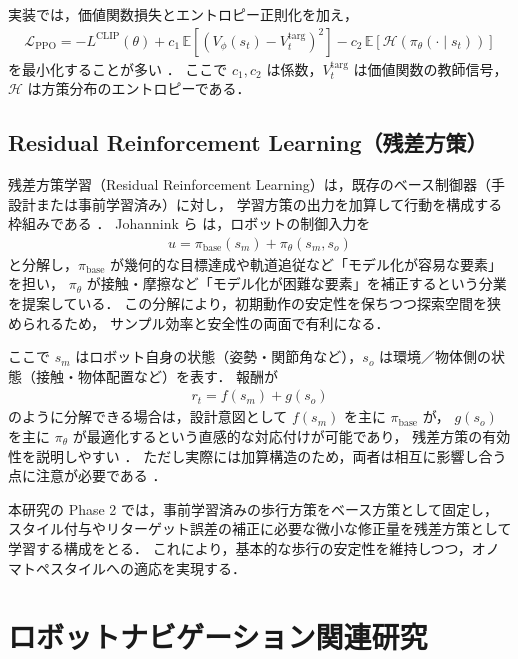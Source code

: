 実装では，価値関数損失とエントロピー正則化を加え，
\begin{align}
  \mathcal{L}_{\mathrm{PPO}}
  = -L^{\mathrm{CLIP}}(\theta)
  + c_1\,\mathbb{E}\left[(V_\phi(s_t)-V_t^{\mathrm{targ}})^2\right]
  - c_2\,\mathbb{E}\left[\mathcal{H}(\pi_\theta(\cdot\mid s_t))\right]
  \label{eq:ppo_full}
\end{align}
を最小化することが多い \cite{PPO}．
ここで $c_1,c_2$ は係数，$V_t^{\mathrm{targ}}$ は価値関数の教師信号，
$\mathcal{H}$ は方策分布のエントロピーである．

\subsection{Residual Reinforcement Learning（残差方策）}
\label{subsec:residual_rl}

残差方策学習（Residual Reinforcement Learning）は，既存のベース制御器（手設計または事前学習済み）に対し，
学習方策の出力を加算して行動を構成する枠組みである \cite{residual_rl}．
Johannink ら \cite{residual_rl} は，ロボットの制御入力を
\begin{align}
  u = \pi_{\mathrm{base}}(s_m) + \pi_{\theta}(s_m, s_o)
\end{align}
と分解し，$\pi_{\mathrm{base}}$ が幾何的な目標達成や軌道追従など「モデル化が容易な要素」を担い，
$\pi_{\theta}$ が接触・摩擦など「モデル化が困難な要素」を補正するという分業を提案している．
この分解により，初期動作の安定性を保ちつつ探索空間を狭められるため，
サンプル効率と安全性の両面で有利になる．

ここで $s_m$ はロボット自身の状態（姿勢・関節角など），$s_o$ は環境／物体側の状態（接触・物体配置など）を表す．
報酬が
\begin{align}
  r_t = f(s_m) + g(s_o)
\end{align}
のように分解できる場合は，設計意図として $f(s_m)$ を主に $\pi_{\mathrm{base}}$ が，
$g(s_o)$ を主に $\pi_{\theta}$ が最適化するという直感的な対応付けが可能であり，
残差方策の有効性を説明しやすい \cite{residual_rl}．
ただし実際には加算構造のため，両者は相互に影響し合う点に注意が必要である \cite{residual_rl}．

本研究の Phase 2 では，事前学習済みの歩行方策をベース方策として固定し，
スタイル付与やリターゲット誤差の補正に必要な微小な修正量を残差方策として学習する構成をとる．
これにより，基本的な歩行の安定性を維持しつつ，オノマトペスタイルへの適応を実現する．

\section{ロボットナビゲーション関連研究}
\label{sec:RobotMotionGen}


